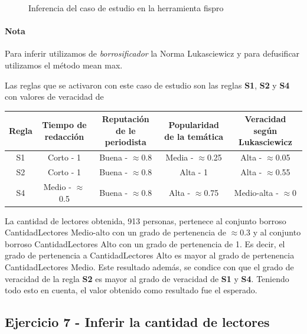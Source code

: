 \documentclass{article}
\begin{document}
\begin{figure}[H]
	\centering
	\caption{Inferencia del caso de estudio en la herramienta fispro}
\end{figure}

\paragraph{Nota} Para inferir utilizamos de \textit{borrosificador} la Norma Lukasciewicz
y para defusificar utilizamos el método mean max.

\vspace{3mm}
Las reglas que se activaron con este caso de estudio son las reglas \textbf{S1}, \textbf{S2} y \textbf{S4} con valores de veracidad de

\begin{table}[H]
	\centering
	\begin{tabular}{c|c c c|c}
		Regla&Tiempo de redacción&Reputación de le periodista&Popularidad de la temática&Veracidad según Lukasciewicz\\
		\hline
		S1&Corto - 1&Buena - $\approx$0.8&Media - $\approx$0.25&Alta - $\approx$0.05\footnotemark\\
		S2&Corto - 1&Buena - $\approx$0.8&Alta - 1&Alta - $\approx$0.55\footnotemark\\
		S4&Medio - $\approx$0.5&Buena - $\approx$0.8&Alta - $\approx$0.75&Medio-alta - $\approx$0\footnotemark\\
	\end{tabular}
\end{table}


La cantidad de lectores obtenida, 913 personas, pertenece al conjunto borroso CantidadLectores Medio-alto con un grado de pertenencia de $\approx$0.3 y al conjunto borroso CantidadLectores Alto con un grado de pertenencia de 1. Es decir, el grado de pertenencia a CantidadLectores Alto es mayor al grado de pertenencia CantidadLectores Medio. Este resultado además, se condice con que el grado de veracidad de la regla \textbf{S2} es mayor al grado de veracidad de \textbf{S1} y \textbf{S4}. Teniendo todo esto en cuenta, el valor obtenido como resultado fue el esperado.

\pagebreak
\subsection*{Ejercicio 7 - Inferir la cantidad de lectores}
\end{document}
